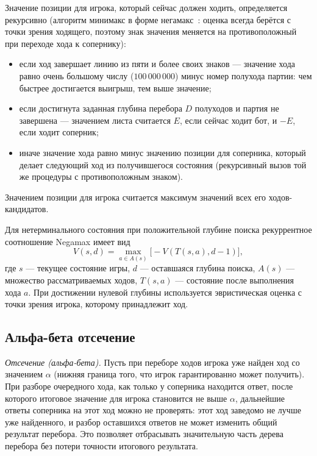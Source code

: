 \documentclass[14pt,a4paper]{extarticle}
\begin{document}
	Значение позиции для игрока, который сейчас должен ходить, определяется рекурсивно (алгоритм минимакс в форме негамакс~\cite{russell}: оценка всегда берётся с точки зрения ходящего, поэтому знак значения меняется на противоположный при переходе хода к сопернику):
	\begin{itemize}
		\item если ход завершает линию из пяти и более своих знаков --- значение хода равно очень большому числу ($100\,000\,000$) минус номер полухода партии: чем быстрее достигается выигрыш, тем выше значение;
		\item если достигнута заданная глубина перебора $D$ полуходов и партия не завершена --- значением листа считается $E$, если сейчас ходит бот, и $-E$, если ходит соперник;
		\item иначе значение хода равно минус значению позиции для соперника, который делает следующий ход из получившегося состояния (рекурсивный вызов той же процедуры с противоположным знаком).
	\end{itemize}
	Значением позиции для игрока считается максимум значений всех его ходов-кандидатов.
	
	Для нетерминального состояния при положительной глубине поиска рекуррентное соотношение Negamax имеет вид
	\begin{equation}\label{eq:negamax}
		V(s,d)=\max_{a\in A(s)}\bigl[-V(T(s,a),d-1)\bigr],
	\end{equation}
	где $s$ --- текущее состояние игры, $d$ --- оставшаяся глубина поиска, $A(s)$ --- множество рассматриваемых ходов, $T(s,a)$ --- состояние после выполнения хода $a$. При достижении нулевой глубины используется эвристическая оценка с точки зрения игрока, которому принадлежит ход.
	
	\subsection{Альфа-бета отсечение}
	
	\emph{Отсечение (альфа-бета).} Пусть при переборе ходов игрока уже найден ход со значением $\alpha$ (нижняя граница того, что игрок гарантированно может получить). При разборе очередного хода, как только у соперника находится ответ, после которого итоговое значение для игрока становится не выше $\alpha$, дальнейшие ответы соперника на этот ход можно не проверять: этот ход заведомо не лучше уже найденного, и разбор оставшихся ответов не может изменить общий результат перебора. Это позволяет отбрасывать значительную часть дерева перебора без потери точности итогового результата.
	
\end{document}

